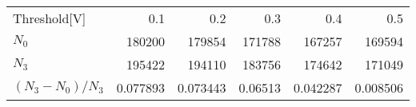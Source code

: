 \begin{tabular}{lrrrrr}
\toprule
Threshold[V] &       0.1 &       0.2 &       0.3&       0.4 &       0.5\\
$N_0$           &  180200 &  179854 &  171788 &  167257 &  169594 \\
$N_3$           &  195422 &  194110 &  183756&  174642 &  171049 \\
$(N_3-N_0)/N_3$   &       0.077893 &       0.073443 &       0.06513 &       0.042287 &       0.008506 \\
\bottomrule
\end{tabular}
